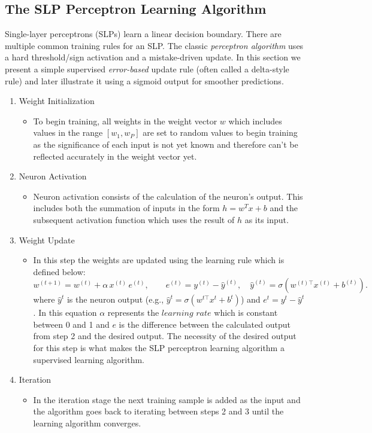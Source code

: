 \documentclass{article}
\begin{document}
\subsection{The SLP Perceptron Learning Algorithm}
Single-layer perceptrons (SLPs) learn a linear decision boundary. There are multiple common training rules for an SLP.
The classic \emph{perceptron algorithm} uses a hard threshold/sign activation and a mistake-driven update.
In this section we present a simple supervised \emph{error-based} update rule (often called a delta-style rule) and later illustrate it using a sigmoid output for smoother predictions.
\newline
\begin{enumerate}
  \item Weight Initialization
  \begin{itemize}
      \item To begin training, all weights in the weight vector $w$ which includes values in the range $[w_1,w_P]$ are set to random values to begin training as the significance of each input is not yet known and therefore can't be reflected accurately in the weight vector yet.
  \end{itemize} 
  
  \item Neuron Activation
  \begin{itemize}
      \item Neuron activation consists of the calculation of the neuron's output. This includes both the summation of inputs in the form $h=w^Tx+b$ and the subsequent activation function which uses the result of $h$ as its input.
  \end{itemize} 
  
  \item Weight Update
  \begin{itemize}
      \item In this step the weights are updated using the learning rule which is defined below:
      \begin{equation}
    w^{(t+1)} = w^{(t)} + \alpha\, x^{(t)}\, e^{(t)},
    \qquad
    e^{(t)} = y^{(t)} - \hat{y}^{(t)}, \quad \hat{y}^{(t)} = \sigma(w^{(t)\top}x^{(t)} + b^{(t)}).
    \end{equation}
  where $\hat{y}^t$ is the neuron output (e.g., $\hat{y}^t=\sigma(w^{t\top}x^t+b^t)$) and $e^t = y^t-\hat{y}^t$.
  In this equation $\alpha$ represents the $learning$ $rate$ which is constant between 0 and 1 and $e$ is the difference between the calculated output from  step 2 and the desired output. The necessity of the desired output for this step is what makes the SLP perceptron learning algorithm a supervised learning algorithm.
  \end{itemize} 
  
  \item Iteration
  \begin{itemize}
      \item In the iteration stage the next training sample is added as the input and the algorithm goes back to iterating between steps 2 and 3 until the learning algorithm converges.
  \end{itemize} 
\end{enumerate}
\end{document}
